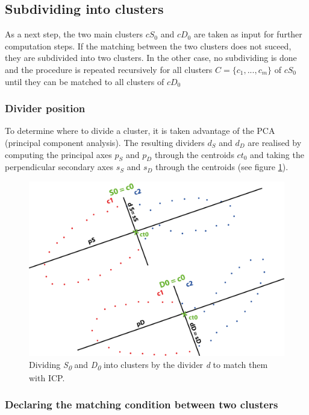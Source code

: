 \documentclass[notitlepage,english]{hgbreport}
\begin{document}
\subsection{Subdividing into clusters}

As a next step, the two main clusters $cS_0$ and $cD_0$ are taken as input for further computation steps. If the matching between the two clusters does not suceed, they are subdivided into two clusters. In the other case, no subdividing is done and the procedure is repeated recursively for all clusters $C = \{{c_1, ..., c_m}\} $ of $cS_0$ until they can be matched to all clusters of $cD_0$   

\subsubsection{Divider position}

To determine where to divide a cluster, it is taken advantage of the PCA (principal component analysis). The resulting dividers $d_S$ and $d_D$ are realised by computing the principal axes $p_S$ and $p_D$ through the centroids $ct_0$ and taking the perpendicular secondary axes $s_S$ and $s_D$ through the centroids (see figure \ref{fig:dc_axes_2p}).

\begin{figure}
	\centering
	\includegraphics[width=0.7\linewidth]{illustration_axes}
	\caption{Dividing \textit{S\textsubscript{0}} and \textit{D\textsubscript{0}} into clusters by the divider \textit{d} to match them with ICP.}
	\label{fig:dc_axes_2p}
\end{figure}

\subsubsection{Declaring the matching condition between two clusters}
\end{document}
